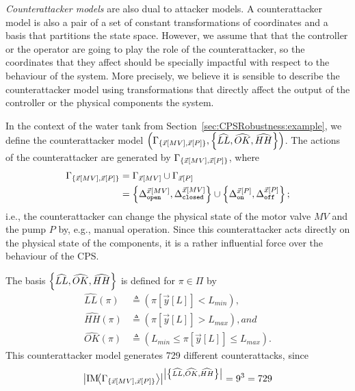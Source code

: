{\emph{Counterattacker models} are also dual to attacker models. A counterattacker model is also a pair of a set of constant transformations of coordinates and a basis that partitions the state space. However, we assume that that the controller or the operator are going to play the role of the counterattacker, so the coordinates that they affect should be specially impactful with respect to the behaviour of the system. More precisely, we believe it is sensible to describe the counterattacker model using transformations that directly affect the output of the controller or the physical components the system. 
\begin{example}
  \label{ex:CPSRobustness:counterattack}
  In the context of the water tank from Section~\ref{sec:CPSRobustness:example}, we define the counterattacker model $\left(\Gamma_{\left\{\vec{x}[MV],\vec{x}[P]\right\}},\left\{\widehat{LL},\widehat{OK},\widehat{HH}\right\}\right)$. The actions of the counterattacker are generated by $\Gamma_{\left\{\vec{x}[MV],\vec{x}[P]\right\}}$, where 
  \begin{align*}
    \Gamma_{\left\{\vec{x}[MV],\vec{x}[P]\right\}}&=\Gamma_{\vec{x}[MV]}\cup\Gamma_{\vec{x}[P]}\\
    &=\left\{{\Delta}^{\vec{x}[MV]}_{\texttt{open}},{\Delta}^{\vec{x}[MV]}_{\texttt{closed}}\right\}\cup \left\{{\Delta}^{\vec{x}[P]}_{\texttt{on}},{\Delta}^{\vec{x}[P]}_{\texttt{off}}\right\};
  \end{align*}
i.e., the counterattacker can change the physical state of the motor valve $MV$ and the pump $P$ by, e.g., manual operation. Since this counterattacker acts directly on the physical state of the components, it is a rather influential force over the behaviour of the CPS.

The basis $\left\{\widehat{LL},\widehat{OK},\widehat{HH}\right\}$ is defined for $\pi\in \Pi$ by 
  \begin{align*}
    \widehat{LL}(\pi)&\triangleq(\pi[\vec{y}[L]]<L_{min}),
    \\\widehat{HH}(\pi)&\triangleq(\pi[\vec{y}[L]]>L_{max}), and\\
    \widehat{OK}(\pi)&\triangleq(L_{min}\leq \pi[\vec{y}[L]]\leq L_{max}).
  \end{align*}
  This counterattacker model generates 729 different counterattacks, 
  since
  \begin{align*}
    \left| \text{IM}\!{{\left<\Gamma_{\left\{\vec{x}[MV],\vec{x}[P]\right\}}\right>}}\right|^{\left|\left\{\widehat{LL},\widehat{OK},\widehat{HH}\right\}\right|}=9^3=729
  \end{align*}


\end{example}}
